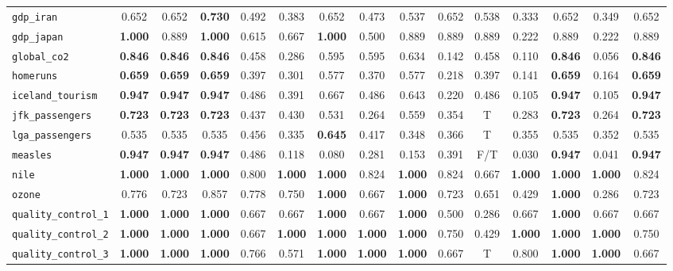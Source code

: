 \begin{tabular}{lcccccccccccccc}
\verb+gdp_iran+ & 0.652 & 0.652 & \textbf{0.730} & 0.492 & 0.383 & 0.652 & 0.473 & 0.537 & 0.652 & 0.538 & 0.333 & 0.652 & 0.349 & 0.652\\
\verb+gdp_japan+ & \textbf{1.000} & 0.889 & \textbf{1.000} & 0.615 & 0.667 & \textbf{1.000} & 0.500 & 0.889 & 0.889 & 0.889 & 0.222 & 0.889 & 0.222 & 0.889\\
\verb+global_co2+ & \textbf{0.846} & \textbf{0.846} & \textbf{0.846} & 0.458 & 0.286 & 0.595 & 0.595 & 0.634 & 0.142 & 0.458 & 0.110 & \textbf{0.846} & 0.056 & \textbf{0.846}\\
\verb+homeruns+ & \textbf{0.659} & \textbf{0.659} & \textbf{0.659} & 0.397 & 0.301 & 0.577 & 0.370 & 0.577 & 0.218 & 0.397 & 0.141 & \textbf{0.659} & 0.164 & \textbf{0.659}\\
\verb+iceland_tourism+ & \textbf{0.947} & \textbf{0.947} & \textbf{0.947} & 0.486 & 0.391 & 0.667 & 0.486 & 0.643 & 0.220 & 0.486 & 0.105 & \textbf{0.947} & 0.105 & \textbf{0.947}\\
\verb+jfk_passengers+ & \textbf{0.723} & \textbf{0.723} & \textbf{0.723} & 0.437 & 0.430 & 0.531 & 0.264 & 0.559 & 0.354 & T & 0.283 & \textbf{0.723} & 0.264 & \textbf{0.723}\\
\verb+lga_passengers+ & 0.535 & 0.535 & 0.535 & 0.456 & 0.335 & \textbf{0.645} & 0.417 & 0.348 & 0.366 & T & 0.355 & 0.535 & 0.352 & 0.535\\
\verb+measles+ & \textbf{0.947} & \textbf{0.947} & \textbf{0.947} & 0.486 & 0.118 & 0.080 & 0.281 & 0.153 & 0.391 & F/T & 0.030 & \textbf{0.947} & 0.041 & \textbf{0.947}\\
\verb+nile+ & \textbf{1.000} & \textbf{1.000} & \textbf{1.000} & 0.800 & \textbf{1.000} & \textbf{1.000} & 0.824 & \textbf{1.000} & 0.824 & 0.667 & \textbf{1.000} & \textbf{1.000} & \textbf{1.000} & 0.824\\
\verb+ozone+ & 0.776 & 0.723 & 0.857 & 0.778 & 0.750 & \textbf{1.000} & 0.667 & \textbf{1.000} & 0.723 & 0.651 & 0.429 & \textbf{1.000} & 0.286 & 0.723\\
\verb+quality_control_1+ & \textbf{1.000} & \textbf{1.000} & \textbf{1.000} & 0.667 & 0.667 & \textbf{1.000} & 0.667 & \textbf{1.000} & 0.500 & 0.286 & 0.667 & \textbf{1.000} & 0.667 & 0.667\\
\verb+quality_control_2+ & \textbf{1.000} & \textbf{1.000} & \textbf{1.000} & 0.667 & \textbf{1.000} & \textbf{1.000} & \textbf{1.000} & \textbf{1.000} & 0.750 & 0.429 & \textbf{1.000} & \textbf{1.000} & \textbf{1.000} & 0.750\\
\verb+quality_control_3+ & \textbf{1.000} & \textbf{1.000} & \textbf{1.000} & 0.766 & 0.571 & \textbf{1.000} & \textbf{1.000} & \textbf{1.000} & 0.667 & T & 0.800 & \textbf{1.000} & \textbf{1.000} & 0.667\\

\end{tabular}
